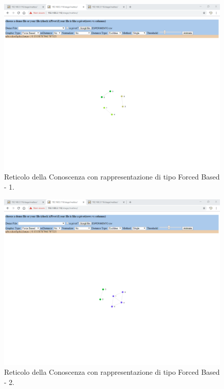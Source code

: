 \noindent
\begin{figure}[H]
\centering
	\includegraphics[width=1\linewidth]{./image/reticoloCorretto3.png}
	\caption{Reticolo della Conoscenza con rappresentazione di tipo Forced Based - 1.}
	\label{Reticolo della Conoscenza con rappresentazione di tipo Forced Based - 1.}
\end{figure}
\noindent
\begin{figure}[H]
\centering
	\includegraphics[width=1\linewidth]{./image/reticoloCorretto4.png}
	\caption{Reticolo della Conoscenza con rappresentazione di tipo Forced Based - 2.}
	\label{Reticolo della Conoscenza con rappresentazione di tipo Forced Based - 2.}
\end{figure}

